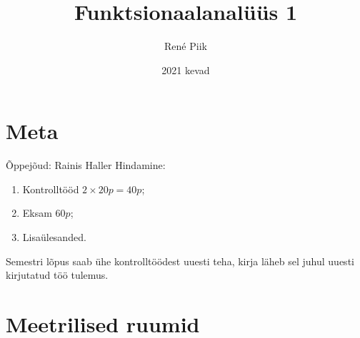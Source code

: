 \documentclass{article}[12pt]
\theoremstyle{definition}
\theoremstyle{definition}
\theoremstyle{definition}
\begin{document}
\title{Funktsionaalanalüüs 1}
\author{René Piik}
\date{2021 kevad}

\maketitle

\section*{Meta}

Õppejõud: Rainis Haller \newline
Hindamine:
\begin{enumerate}
	\item Kontrolltööd $2\times 20p = 40p$;
	\item Eksam $60p$;
	\item Lisaülesanded.
\end{enumerate}
Semestri lõpus saab ühe kontrolltöödest uuesti teha, kirja läheb sel juhul uuesti kirjutatud töö tulemus.

\tableofcontents

\section{Meetrilised ruumid}
\end{document}
